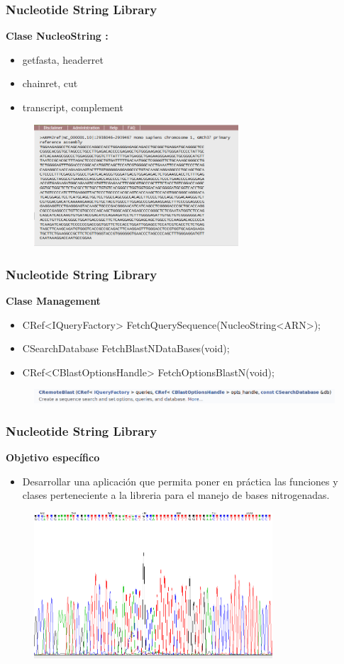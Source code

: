 \documentclass{beamer}
\begin{document}
\begin{frame}
\frametitle{Nucleotide String Library}
\textbf{\large{Clase NucleoString :}}
\begin{itemize}
\item{getfasta, headerret}
\item{chainret, cut}
\item{transcript, complement}
\end{itemize}
\begin{figure}
		\includegraphics[width=3.0in]{fasta.png}
\end{figure}
\end{frame}

\begin{frame}
\frametitle{Nucleotide String Library}
\textbf{\large{Clase Management}}
\begin{itemize}
\item{CRef<IQueryFactory> FetchQuerySequence(NucleoString<ARN>);}
\item{CSearchDatabase FetchBlastNDataBases(void);}
\item{CRef<CBlastOptionsHandle> FetchOptionsBlastN(void);}
\end{itemize}
\begin{figure}
		\includegraphics[width=4.7in]{remote.png}
\end{figure}
\end{frame}

\begin{frame}
\frametitle{Nucleotide String Library}
\textbf{\large{Objetivo específico}}
\begin{itemize}
\item Desarrollar una aplicación que permita poner en práctica las funciones y clases perteneciente a la libreria para el manejo de bases nitrogenadas.
\end{itemize}
\begin{figure}
		\includegraphics[width=3.5in]{2.png}
\end{figure}
\end{frame}
\end{document}
